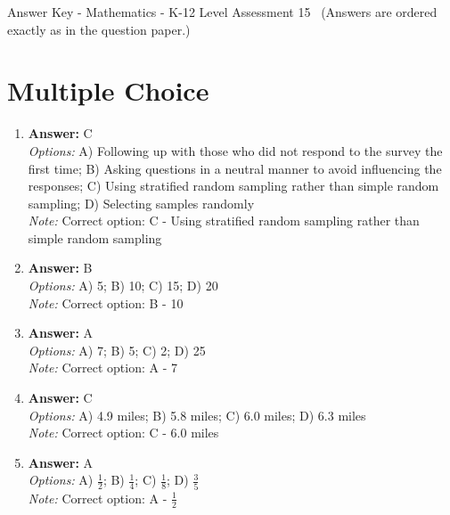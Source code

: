 \documentclass[12pt]{article}
\begin{document}
\begin{center}
Answer Key - Mathematics - K-12 Level Assessment 15 \
\small (Answers are ordered exactly as in the question paper.)
\end{center}

\section*{Multiple Choice}
\begin{enumerate}[label=\arabic*.]
\item \textbf{Answer:} C
\\ \textit{Options:} A) Following up with those who did not respond to the survey the first time; B) Asking questions in a neutral manner to avoid influencing the responses; C) Using stratified random sampling rather than simple random sampling; D) Selecting samples randomly
\\ \textit{Note:} Correct option: C - Using stratified random sampling rather than simple random sampling
\item \textbf{Answer:} B
\\ \textit{Options:} A) 5; B) 10; C) 15; D) 20
\\ \textit{Note:} Correct option: B - 10
\item \textbf{Answer:} A
\\ \textit{Options:} A) 7; B) 5; C) 2; D) 25
\\ \textit{Note:} Correct option: A - 7
\item \textbf{Answer:} C
\\ \textit{Options:} A) 4.9 miles; B) 5.8 miles; C) 6.0 miles; D) 6.3 miles
\\ \textit{Note:} Correct option: C - 6.0 miles
\item \textbf{Answer:} A
\\ \textit{Options:} A) \ensuremath{\frac{1}{2}}; B) \ensuremath{\frac{1}{4}}; C) \ensuremath{\frac{1}{8}}; D) \ensuremath{\frac{3}{5}}
\\ \textit{Note:} Correct option: A - \ensuremath{\frac{1}{2}}
\end{enumerate}
\end{document}
